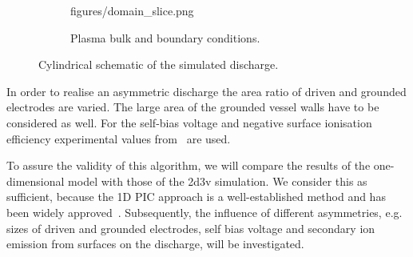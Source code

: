 \begin{figure}[!t]
\begin{subfigure}{0.49\textwidth}
					{figures/domain_slice.png}
                \caption{Plasma bulk and boundary conditions.}
            \end{subfigure}
            \caption[Schematic of the simulation domain]{%
			    Cylindrical schematic of the simulated %
			    discharge.~\cite{Matthias15}}%
			\label{fig:radialcylinder}
      \end{figure}
%        
		In order to realise an asymmetric discharge the area ratio of driven and grounded electrodes are varied. The large area of the grounded vessel walls have to be considered as well. For the self-bias voltage and negative surface ionisation efficiency experimental values from~\cite{Meichsner13,Kullig12} are used.
%
		\par\bigskip
		To assure the validity of this algorithm, we will compare the results of the one-dimensional model with those of the 2d3v simulation. We consider this as sufficient, because the 1D PIC approach is a well-established method and has been widely approved~\cite{Matyash07oxIII,Bronold07b,Matthias15}. Subsequently, the influence of different asymmetries, e.g. sizes of driven and grounded electrodes, self bias voltage and secondary ion emission from surfaces on the discharge, will be investigated.
%
